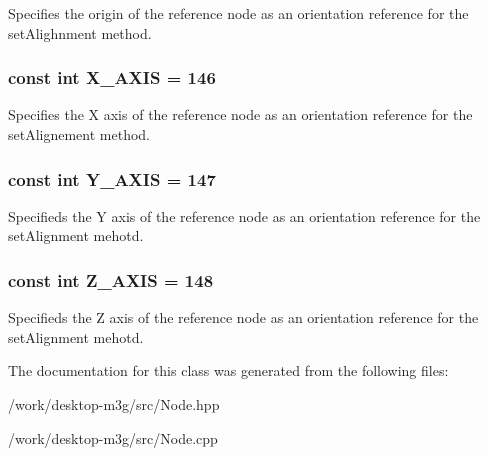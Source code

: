 Specifies the origin of the reference node as an orientation reference for the setAlighnment method. \hypertarget{classm3g_1_1Node_dd4bccb7b9c652e726d58b06bd28dab2}{
\subsubsection[{X\_\-AXIS}]{\setlength{\rightskip}{0pt plus 5cm}const int {\bf X\_\-AXIS} = 146}}
\label{classm3g_1_1Node_dd4bccb7b9c652e726d58b06bd28dab2}


Specifies the X axis of the reference node as an orientation reference for the setAlignement method. \hypertarget{classm3g_1_1Node_3248ff73b5411ab0a66a38c451c8b6fe}{
\subsubsection[{Y\_\-AXIS}]{\setlength{\rightskip}{0pt plus 5cm}const int {\bf Y\_\-AXIS} = 147}}
\label{classm3g_1_1Node_3248ff73b5411ab0a66a38c451c8b6fe}


Specifieds the Y axis of the reference node as an orientation reference for the setAlignment mehotd. \hypertarget{classm3g_1_1Node_a928e648c9ae9b4706937831f77f0c67}{
\subsubsection[{Z\_\-AXIS}]{\setlength{\rightskip}{0pt plus 5cm}const int {\bf Z\_\-AXIS} = 148}}
\label{classm3g_1_1Node_a928e648c9ae9b4706937831f77f0c67}


Specifieds the Z axis of the reference node as an orientation reference for the setAlignment mehotd. 

The documentation for this class was generated from the following files:\begin{CompactItemize}
\item 
/work/desktop-m3g/src/Node.hpp\item 
/work/desktop-m3g/src/Node.cpp\end{CompactItemize}
